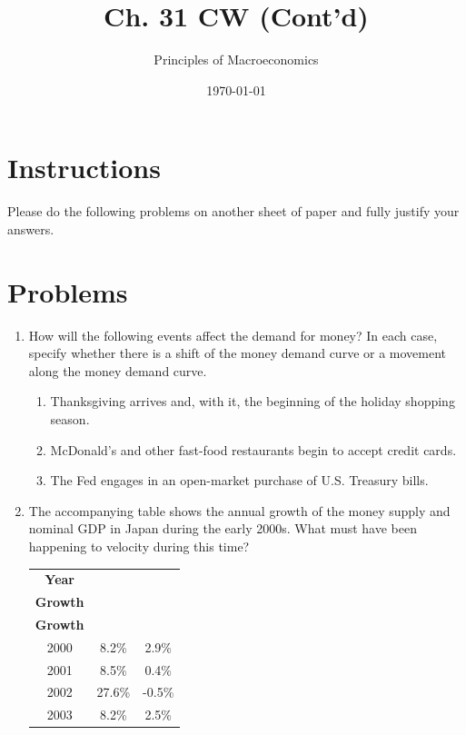 \documentclass{article}
\title{Ch. 31 CW (Cont'd)}
\author{Principles of Macroeconomics}
\date{\today}
\begin{document}
\maketitle

\section*{Instructions} Please do the following problems on another sheet of paper and fully justify your answers.

\section*{Problems}

\begin{enumerate}

\item How will the following events affect the demand for money? In each case, specify whether there is a shift of the money demand curve or a movement along the money demand curve.

	\begin{enumerate}
	
	\item Thanksgiving arrives and, with it, the beginning of the holiday shopping season.
	
	\item McDonald's and other fast-food restaurants begin to accept credit cards.
	
	\item The Fed engages in an open-market purchase of U.S. Treasury bills.
	
	\end{enumerate}
	
\item The accompanying table shows the annual growth of the money supply and nominal GDP in Japan during the early 2000s. What must have been happening to velocity during this time? 

	\begin{tabular}{c | c | c }
	\textbf{Year} & \makecell{\textbf{Money Supply}\\\textbf{Growth}} & \makecell{\textbf{Nominal GDP}\\\textbf{Growth}} \\
	\hline
	2000 & 8.2\% & 2.9\% \\
	2001 & 8.5\% & 0.4\% \\
	2002 & 27.6\% & -0.5\% \\
	2003 & 8.2\% & 2.5\%
	\end{tabular}
	

\end{enumerate}
\end{document}
